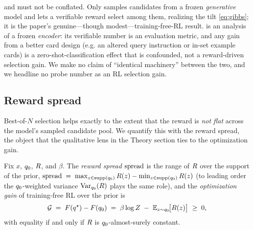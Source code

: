 \begin{remark}
\label{rem:generative}
 and  must not be conflated. Only  samples candidates from a frozen \emph{generative} model and lets a verifiable reward select among them, realizing the tilt \eqref{eq:gibbs}; it is the paper's genuine---though modest---training-free-RL result.  is an analysis of a frozen \emph{encoder}: its verifiable number is an evaluation metric, and any gain from a better card design (e.g. an altered query instruction or in-set example cards) is a zero-shot-classification effect that is confounded, not a reward-driven selection gain. We make no claim of ``identical machinery'' between the two, and we headline no probe number as an RL selection gain.
\end{remark}

\subsection{Reward spread}
\label{subsec:spread}

Best-of-$N$ selection helps exactly to the extent that the reward is \emph{not flat} across the model's sampled candidate pool. We quantify this with the reward spread, the object that the qualitative lens in the Theory section ties to the optimization gain.

\begin{definition}
\label{def:spread}
Fix $x$, $q_{0}$, $R$, and $\beta$. The \emph{reward spread} $\mathrm{spread}$ is the range of $R$ over the support of the prior, $\mathrm{spread} \;=\; \max_{z\in\operatorname{supp}(q_{0})}R(z)-\min_{z\in\operatorname{supp}(q_{0})}R(z)$ (to leading order the $q_{0}$-weighted variance $\operatorname{Var}_{q_{0}}(R)$ plays the same role), and the \emph{optimization gain} of training-free RL over the prior is
\begin{equation}
\label{eq:gain}
\mathcal{G} \;=\; F\!\left(q^{\star}\right) - F\!\left(q_{0}\right) \;=\; \beta\log Z \;-\; \mathbb{E}_{z\sim q_{0}}\!\big[R(z)\big] \;\ge\; 0,
\end{equation}
with equality if and only if $R$ is $q_{0}$-almost-surely constant.
\end{definition}

